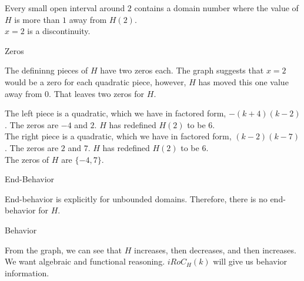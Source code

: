 \documentclass{ximera}
\begin{document}
\begin{exercise}
\begin{question}
Every small open interval around $2$ contains a domain number where the value of $H$ is more than $1$ away from $H(2)$. \\


$x = 2$ is a discontinuity.



\end{question}





\begin{question} Zeros


The defininng pieces of $H$ have two zeros each.  The graph suggests that $x=2$ would be a zero for each quadratic piece, however, $H$ has moved this one value away from $0$.  That leaves two zeros for $H$.


\begin{explanation}



The left piece is a quadratic, which we have in factored form, $-(k+4)(k-2)$.  The zeros are $-4$ and $2$.  $H$ has redefined $H(2)$ to be $6$. \\


The right piece is a quadratic, which we have in factored form, $(k-2)(k-7)$.  The zeros are $2$ and $7$.  $H$ has redefined $H(2)$ to be $6$. \\


The zeros of $H$ are $\{ -4, 7 \}$.


\end{explanation}


\end{question}





\begin{question} End-Behavior



End-behavior is explicitly for unbounded domains.  Therefore, there is no end-behavior for $H$.


\end{question}






\begin{question} Behavior



From the graph, we can see that $H$ increases, then decreases, and then increases.  We want algebraic and functional reasoning. $iRoC_H(k)$ will give us behavior information.   \\



\end{question}
\end{exercise}
\end{document}
